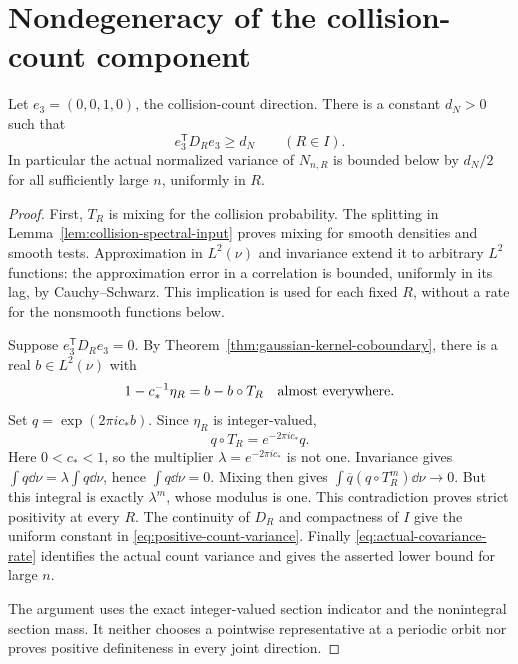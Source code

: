 \section{Nondegeneracy of the collision-count component}
\label{sec:count-nondegeneracy}
\begin{corollary}
\label{cor:positive-count-variance}
Let $e_3=(0,0,1,0)$, the collision-count direction. There is a constant
$d_N>0$ such that
\begin{equation}\label{eq:positive-count-variance}
 e_3^{\mathsf T}D_Re_3\ge d_N\qquad(R\in I).
\end{equation}
In particular the actual normalized variance of $N_{n,R}$ is bounded
below by $d_N/2$ for all sufficiently large $n$, uniformly in $R$.
\end{corollary}
\begin{proof}
First, $T_R$ is mixing for the collision probability. The splitting in
Lemma~\ref{lem:collision-spectral-input} proves mixing for smooth
densities and smooth tests. Approximation in $L^2(\nu)$ and invariance
extend it to arbitrary $L^2$ functions: the approximation error in a
correlation is bounded, uniformly in its lag, by Cauchy--Schwarz.
This implication is used for each fixed $R$, without a rate for the
nonsmooth functions below.

Suppose $e_3^{\mathsf T}D_Re_3=0$. By
Theorem~\ref{thm:gaussian-kernel-coboundary}, there is a real
$b\in L^2(\nu)$ with
\[
 1-c_*^{-1}\eta_R=b-b\circ T_R
 \quad\hbox{almost everywhere}.
\]
Set $q=\exp(2\pi i c_*b)$. Since $\eta_R$ is integer-valued,
\[
 q\circ T_R=e^{-2\pi i c_*}q.
\]
Here $0<c_*<1$, so the multiplier $\lambda=e^{-2\pi i c_*}$ is
not one. Invariance gives $\int q\dd\nu=\lambda\int q\dd\nu$,
hence $\int q\dd\nu=0$. Mixing then gives
$\int\overline q(q\circ T_R^m)\dd\nu\to0$. But this integral is
exactly $\lambda^m$, whose modulus is one. This contradiction proves
strict positivity at every $R$. The continuity of $D_R$ and compactness
of $I$ give the uniform constant in \eqref{eq:positive-count-variance}.
Finally \eqref{eq:actual-covariance-rate} identifies the actual count
variance and gives the asserted lower bound for large $n$.

The argument uses the exact integer-valued section indicator and the
nonintegral section mass. It neither chooses a pointwise representative
at a periodic orbit nor proves positive definiteness in every joint
direction.
\end{proof}

